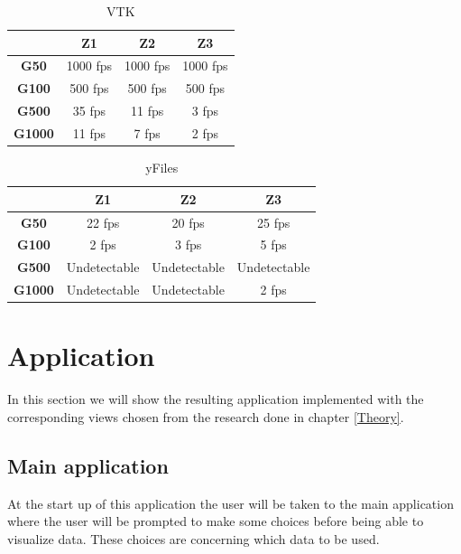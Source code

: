 \documentclass[a4paper,11pt]{kth-mag}
\begin{document}
\newline
\begin{table}[h]
\centering
\caption{VTK}
\begin{tabular}{|c|c|c|c|}
\hline
\textbf{}      & \textbf{Z1} & \textbf{Z2} & \textbf{Z3} \\ \hline
\textbf{G50}   & 1000 fps    & 1000 fps    & 1000 fps    \\ \hline
\textbf{G100}  & 500 fps     & 500 fps     & 500 fps     \\ \hline
\textbf{G500}  & 35 fps      & 11 fps      & 3 fps       \\ \hline
\textbf{G1000} & 11 fps      & 7 fps       & 2 fps       \\ \hline
\end{tabular}
\label{table-VTK}
\end{table}
\newline
\begin{table}[h]
\centering
\caption{yFiles}
\begin{tabular}{|c|c|c|c|}
\hline
\textbf{}      & \textbf{Z1}  & \textbf{Z2}  & \textbf{Z3}  \\ \hline
\textbf{G50}   & 22 fps       & 20 fps       & 25 fps       \\ \hline
\textbf{G100}  & 2 fps        & 3 fps        & 5 fps        \\ \hline
\textbf{G500}  & Undetectable & Undetectable & Undetectable \\ \hline
\textbf{G1000} & Undetectable & Undetectable & 2 fps        \\ \hline
\end{tabular}
\label{table-yFiles}
\end{table}

\section{Application}
\label{sec:application}
In this section we will show the resulting application implemented with the corresponding views chosen from the research done in chapter \ref{Theory}.
 \subsection{Main application}
At the start up of this application the user will be taken to the main application where the user will be prompted to make some choices before being able to visualize data. 
These choices are concerning which data to be used. 
\end{document}

